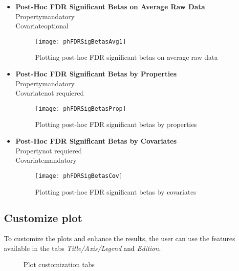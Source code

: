 \documentclass[fadttsterUserGuide_use]{subfiles}
\begin{document}
\begin{itemize}
		\item \textbf{Post-Hoc FDR Significant Betas on Average Raw Data}\\
		Property\textrightarrow mandatory\\
		Covariate\textrightarrow optional
		\begin{figure}[H]
  			\texttt{[image: phFDRSigBetasAvg1]}
  			\caption{Plotting post-hoc FDR significant betas on average raw data}
    		\label{fig:phFDRSigBetasAvg1}
		\end{figure}
		\item \textbf{Post-Hoc FDR Significant Betas by Properties}\\
		Property\textrightarrow mandatory\\
		Covariate\textrightarrow not requiered
		\begin{figure}[H]
  			\texttt{[image: phFDRSigBetasProp]}
  			\caption{Plotting post-hoc FDR significant betas by properties}
    		\label{fig:phFDRSigBetasProp}
		\end{figure}
		\vfill
		\newpage
		
		\item \textbf{Post-Hoc FDR Significant Betas by Covariates}\\
		Property\textrightarrow not requiered\\
		Covariate\textrightarrow mandatory
		\begin{figure}[H]
  			\texttt{[image: phFDRSigBetasCov]}
  			\caption{Plotting post-hoc FDR significant betas by covariates}
    		\label{fig:phFDRSigBetasCov}
		\end{figure}
	\end{itemize}
	\vfill
	\newpage	
	
	\subsection{Customize plot}
	To customize the plots and enhance the results, the user can use the features available in the tabs \textit{Title/Axis/Legend} and \textit{Edition}.
	\begin{figure}[H]
    	\caption{Plot customization tabs}
    	\label{fig:plotCustomization}
	\end{figure}	
	\vfill
	\newpage
	
\end{document}
